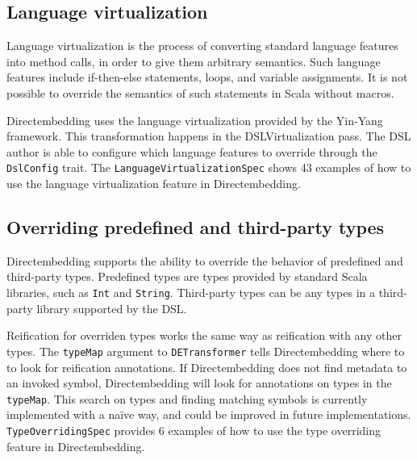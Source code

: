 \subsection{Language virtualization} %
\label{sub:LanguageVirtualization}
Language virtualization is the process of converting standard language features into method calls, in order to give them arbitrary semantics.
Such language features include if-then-else statements, loops, and variable assignments.
It is not possible to override the semantics of such statements in Scala without macros.

Directembedding uses the language virtualization provided by the Yin-Yang~\autocite{jovanovic_yin-yang:_2014} framework.
This transformation happens in the DSLVirtualization pass.
The DSL author is able to configure which language features to override through the \texttt{DslConfig} trait.
The \texttt{LanguageVirtualizationSpec} shows 43 examples of how to use the language virtualization feature in Directembedding.

\subsection{Overriding predefined and third-party types} %
\label{sub:Overridingpredefinedandthirdpartytypes}
Directembedding supports the ability to override the behavior of predefined and third-party types.
Predefined types are types provided by standard Scala libraries, such as \texttt{Int} and \texttt{String}.
Third-party types can be any types in a third-party library supported by the DSL.\

\begin{sloppypar}
    Reification for overriden types works the same way as reification with any other types.
    The \texttt{typeMap} argument to \texttt{DETransformer} tells Directembedding where to to look for reification annotations.
    If Directembedding does not find metadata to an invoked symbol, Directembedding will look for annotations on types in the \texttt{typeMap}.
    This search on types and finding matching symbols is currently implemented with a naïve way, and could be improved in future implementations.
    \texttt{TypeOverridingSpec} provides 6 examples of how to use the type overriding feature in Directembedding.
\end{sloppypar}


